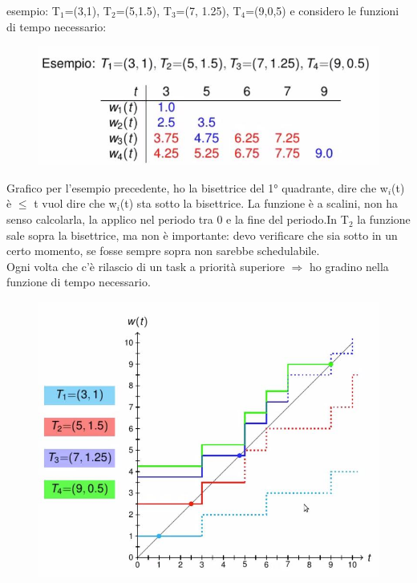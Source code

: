 \documentclass[12pt, oneside]{extbook}
\begin{document}
esempio: T$_{1}$=(3,1), T$_{2}$=(5,1.5), T$_{3}$=(7, 1.25), T$_{4}$=(9,0,5) e considero le funzioni di tempo necessario:\\
\begin{figure}[!h]
\centering
\includegraphics[scale=0.4]{immagini/image-002.jpg}
\end{figure}
Grafico per l'esempio precedente, ho la bisettrice del 1° quadrante, dire che w$_{i}$(t) è $\leq$ t vuol dire che w$_{i}$(t) sta sotto la bisettrice. La funzione è a scalini, non ha senso calcolarla, la applico nel periodo tra 0 e la fine del periodo.In T$_{2}$ la funzione sale sopra la bisettrice, ma non è importante: devo verificare che sia sotto in un certo momento, se fosse sempre sopra non sarebbe schedulabile.\\ Ogni volta che c'è rilascio di un task a priorità superiore $\Rightarrow$ ho gradino nella funzione di tempo necessario.\\
\begin{figure}[!h]
\centering
\includegraphics[scale=0.4]{immagini/image-003.jpg}
\end{figure}
\end{document}
